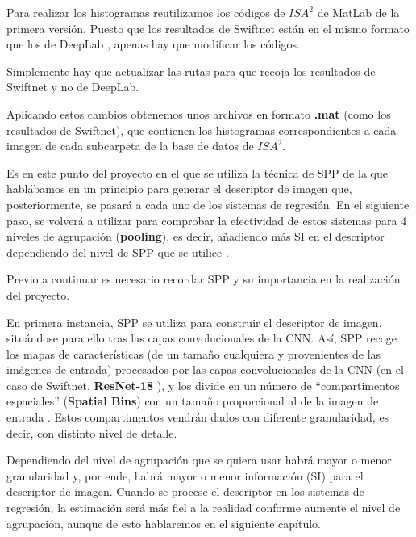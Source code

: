 Para realizar los histogramas reutilizamos los códigos de $ISA^{2}$ \cite{isa2} de MatLab de la primera versión. Puesto que los resultados de Swiftnet están en el mismo formato que los de DeepLab \cite{deeplab}, apenas hay que modificar los códigos.

Simplemente hay que actualizar las rutas para que recoja los resultados de Swiftnet y no de DeepLab.

Aplicando estos cambios obtenemos unos archivos en formato \textbf{.mat} (como los resultados de Swiftnet), que contienen los histogramas correspondientes a cada imagen de cada subcarpeta de la base de datos de $ISA^{2}$.

Es en este punto del proyecto en el que se utiliza la técnica de \ac{SPP} \cite{spp} de la que hablábamos en un principio para generar el descriptor de imagen que, posteriormente, se pasará a cada uno de los sistemas de regresión. En el siguiente paso, se volverá a utilizar para comprobar la efectividad de estos sistemas para 4 niveles de agrupación (\textbf{pooling}), es decir, añadiendo más \ac{SI} en el descriptor dependiendo del nivel de \ac{SPP} que se utilice \cite{isa2}.

Previo a continuar es necesario recordar \ac{SPP} y su importancia en la realización del proyecto.

En primera instancia, \ac{SPP} se utiliza para construir el descriptor de imagen, situándose para ello tras las capas convolucionales de la \ac{CNN}. Así, \ac{SPP} recoge los mapas de características (de un tamaño cualquiera y provenientes de las imágenes de entrada) procesados por las capas convolucionales de la \ac{CNN} (en el caso de Swiftnet, \textbf{ResNet-18} \cite{swiftnet}), y los divide en un número de ``compartimentos espaciales'' (\textbf{Spatial Bins}) con un tamaño proporcional al de la imagen de entrada \cite{spp2}. Estos compartimentos vendrán dados con diferente granularidad, es decir, con distinto nivel de detalle.

Dependiendo del nivel de agrupación que se quiera usar habrá mayor o menor granularidad y, por ende, habrá mayor o menor información (\ac{SI}) para el descriptor de imagen. Cuando se procese el descriptor en los sistemas de regresión, la estimación será más fiel a la realidad conforme aumente el nivel de agrupación, aunque de esto hablaremos en el siguiente capítulo.


